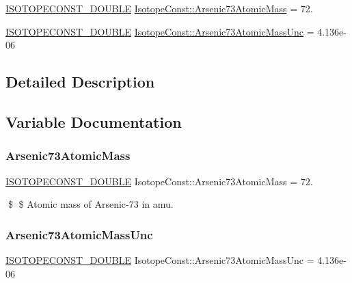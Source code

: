\begin{DoxyCompactItemize}
\item 
\mbox{\hyperlink{group___isotope_const-_macros_ga8f45a7272ce02c0b4c65c44636ed719a}{I\+S\+O\+T\+O\+P\+E\+C\+O\+N\+S\+T\+\_\+\+D\+O\+U\+B\+LE}} \mbox{\hyperlink{group___isotope_const-_arsenic-_as73_gae9aefa9648118bf9cca877eebd038cd8}{Isotope\+Const\+::\+Arsenic73\+Atomic\+Mass}} = 72.
\item 
\mbox{\hyperlink{group___isotope_const-_macros_ga8f45a7272ce02c0b4c65c44636ed719a}{I\+S\+O\+T\+O\+P\+E\+C\+O\+N\+S\+T\+\_\+\+D\+O\+U\+B\+LE}} \mbox{\hyperlink{group___isotope_const-_arsenic-_as73_gad663ef2ec5e01f2e5a1ac48734f41a72}{Isotope\+Const\+::\+Arsenic73\+Atomic\+Mass\+Unc}} = 4.\+136e-\/06
\end{DoxyCompactItemize}


\subsection{Detailed Description}


\subsection{Variable Documentation}
\mbox{\label{group___isotope_const-_arsenic-_as73_gae9aefa9648118bf9cca877eebd038cd8}} 
\subsubsection{\texorpdfstring{Arsenic73\+Atomic\+Mass}{Arsenic73AtomicMass}}
{\footnotesize\ttfamily \mbox{\hyperlink{group___isotope_const-_macros_ga8f45a7272ce02c0b4c65c44636ed719a}{I\+S\+O\+T\+O\+P\+E\+C\+O\+N\+S\+T\+\_\+\+D\+O\+U\+B\+LE}} Isotope\+Const\+::\+Arsenic73\+Atomic\+Mass = 72.}

\$ \$ Atomic mass of Arsenic-\/73 in amu. \mbox{\label{group___isotope_const-_arsenic-_as73_gad663ef2ec5e01f2e5a1ac48734f41a72}} 
\subsubsection{\texorpdfstring{Arsenic73\+Atomic\+Mass\+Unc}{Arsenic73AtomicMassUnc}}
{\footnotesize\ttfamily \mbox{\hyperlink{group___isotope_const-_macros_ga8f45a7272ce02c0b4c65c44636ed719a}{I\+S\+O\+T\+O\+P\+E\+C\+O\+N\+S\+T\+\_\+\+D\+O\+U\+B\+LE}} Isotope\+Const\+::\+Arsenic73\+Atomic\+Mass\+Unc = 4.\+136e-\/06}

